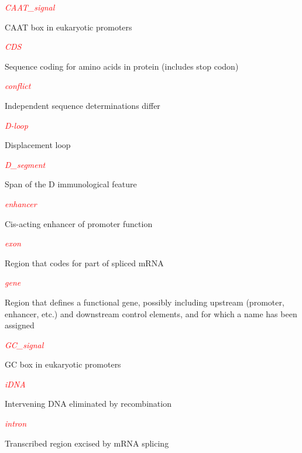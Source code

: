 \textcolor{red}{\textit{CAAT\_signal}}
\begin{adjustwidth}{1cm}{}
CAAT box in eukaryotic promoters
\end{adjustwidth}

\textcolor{red}{\textit{CDS}}
\begin{adjustwidth}{1cm}{}
Sequence coding for amino acids in protein (includes stop codon)
\end{adjustwidth}

\textcolor{red}{\textit{conflict}}
\begin{adjustwidth}{1cm}{}
Independent sequence determinations differ
\end{adjustwidth}

\textcolor{red}{\textit{D-loop}}
\begin{adjustwidth}{1cm}{}
Displacement loop
\end{adjustwidth}

\textcolor{red}{\textit{D\_segment}}
\begin{adjustwidth}{1cm}{}
Span of the D immunological feature
\end{adjustwidth}

\textcolor{red}{\textit{enhancer}}
\begin{adjustwidth}{1cm}{}
Cis-acting enhancer of promoter function
\end{adjustwidth}

\textcolor{red}{\textit{exon}}
\begin{adjustwidth}{1cm}{}
Region that codes for part of spliced mRNA
\end{adjustwidth}

\textcolor{red}{\textit{gene}}
\begin{adjustwidth}{1cm}{}
Region that defines a functional gene, possibly including upstream (promoter, enhancer, etc.) and downstream control elements, and for which a name has been assigned 
\end{adjustwidth}

\textcolor{red}{\textit{GC\_signal}}
\begin{adjustwidth}{1cm}{}
GC box in eukaryotic promoters
\end{adjustwidth}

\textcolor{red}{\textit{iDNA}}
\begin{adjustwidth}{1cm}{}
Intervening DNA eliminated by recombination
\end{adjustwidth}

\textcolor{red}{\textit{intron}}
\begin{adjustwidth}{1cm}{}
Transcribed region excised by mRNA splicing
\end{adjustwidth}

